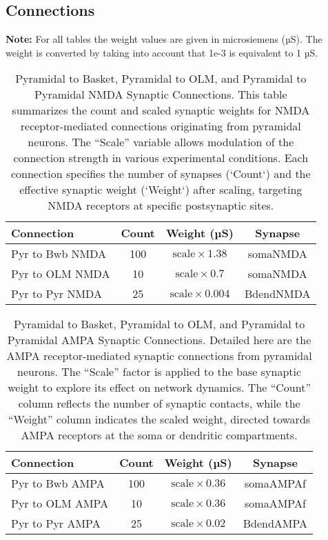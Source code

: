 \subsection{Connections}
\textbf{Note:} For all tables the weight values are given in microsiemens (µS).
The weight is converted by taking into account that 1e-3 is equivalent to 1 µS.
\begin{table}[htbp]
    \centering
    \caption[Pyr to Other Cells NMDA Connections Summary]{Pyramidal to Basket, Pyramidal to OLM, and Pyramidal to Pyramidal NMDA Synaptic Connections. This table summarizes the count and scaled synaptic weights for NMDA receptor-mediated connections originating from pyramidal neurons. The ``Scale'' variable allows modulation of the connection strength in various experimental conditions. Each connection specifies the number of synapses (`Count`) and the effective synaptic weight (`Weight`) after scaling, targeting NMDA receptors at specific postsynaptic sites.}\label{tab:pyr_nmda_connections}
    \begin{tabular}{lccc}
        \hline
        Connection      & Count & Weight (µS)                     & Synapse   \\
        \hline
        Pyr to Bwb NMDA & 100   & \( \text{scale} \times 1.38 \)  & somaNMDA  \\
        Pyr to OLM NMDA & 10    & \( \text{scale} \times 0.7 \)   & somaNMDA  \\
        Pyr to Pyr NMDA & 25    & \( \text{scale} \times 0.004 \) & BdendNMDA \\
        \hline
    \end{tabular}
\end{table}

\begin{table}[htbp]
    \centering
    \caption[Pyr to Other Cells AMPA Connections Summary]{Pyramidal to Basket, Pyramidal to OLM, and Pyramidal to Pyramidal AMPA Synaptic Connections. Detailed here are the AMPA receptor-mediated synaptic connections from pyramidal neurons. The ``Scale'' factor is applied to the base synaptic weight to explore its effect on network dynamics. The ``Count'' column reflects the number of synaptic contacts, while the ``Weight'' column indicates the scaled weight, directed towards AMPA receptors at the soma or dendritic compartments.}\label{tab:pyr_ampa_connections}
    \begin{tabular}{lccc}
        \hline
        Connection      & Count & Weight (µS)                    & Synapse   \\
        \hline
        Pyr to Bwb AMPA & 100   & \( \text{scale} \times 0.36 \) & somaAMPAf \\
        Pyr to OLM AMPA & 10    & \( \text{scale} \times 0.36 \) & somaAMPAf \\
        Pyr to Pyr AMPA & 25    & \( \text{scale} \times 0.02 \) & BdendAMPA \\
        \hline
    \end{tabular}
\end{table}

